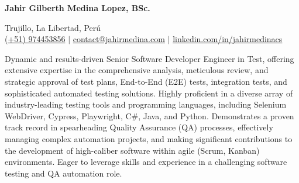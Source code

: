 \begin{center}
    {\Huge\bfseries Jahir Gilberth Medina Lopez, BSc.} %
    \vspace{0.05in}

    \normalsize %
    Trujillo, La Libertad, Perú \\ %
    \href{tel:+51974453856}{(+51) 974453856} $|$ \href{mailto:contact@jahirmedina.com}{contact@jahirmedina.com} $|$ %
    \href{https://www.linkedin.com/in/jahirmedinacs/}{linkedin.com/in/jahirmedinacs} %
\end{center}
\vspace{0.15in}

\begin{center}
\begin{minipage}{0.9\textwidth} %
\RaggedRight %
Dynamic and results-driven Senior Software Developer Engineer in Test, offering extensive expertise in the comprehensive analysis, meticulous review, and strategic approval of test plans, End-to-End (E2E) tests, integration tests, and sophisticated automated testing solutions. Highly proficient in a diverse array of industry-leading testing tools and programming languages, including Selenium WebDriver, Cypress, Playwright, C\#, Java, and Python. Demonstrates a proven track record in spearheading Quality Assurance (QA) processes, effectively managing complex automation projects, and making significant contributions to the development of high-caliber software within agile (Scrum, Kanban) environments. Eager to leverage skills and experience in a challenging software testing and QA automation role.
\end{minipage}
\end{center}
\vspace{0.1in}